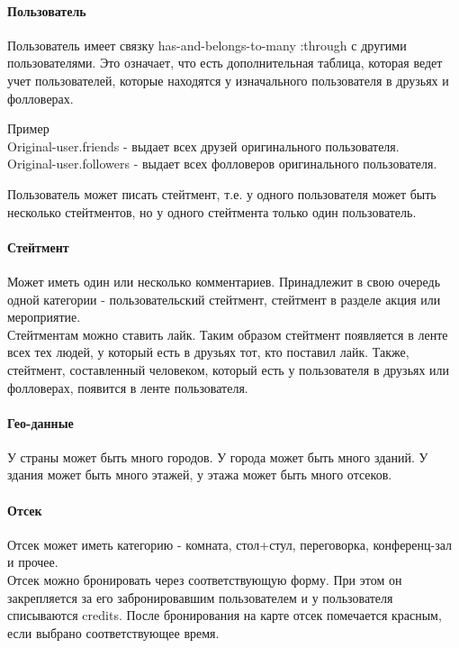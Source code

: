 \documentclass[DIV=calc, paper=a4, fontsize=11pt]{scrartcl} %
\begin{document}
\paragraph{Пользователь}
Пользователь имеет связку has-and-belongs-to-many :through с другими пользователями. Это означает, что есть дополнительная таблица, которая ведет учет пользователей, которые находятся у изначального пользователя в друзьях и фолловерах.

\begin{framed}
Пример
\\[0.5cm]
Original-user.friends - выдает всех друзей оригинального пользователя.
\\[0.5cm]
Original-user.followers - выдает всех фолловеров оригинального пользователя.
\end{framed}

Пользователь может писать стейтмент, т.е. у одного пользователя может быть несколько стейтментов, но у одного стейтмента только один пользователь.

\paragraph{Стейтмент}
Может иметь один или несколько комментариев. Принадлежит в свою очередь одной категории - пользовательский стейтмент, стейтмент в разделе акция или мероприятие. 
\\[0.5cm]
Стейтментам можно ставить лайк. Таким образом стейтмент появляется в ленте всех тех людей, у который есть в друзьях тот, кто поставил лайк. Также, стейтмент, составленный человеком, который есть у пользователя в друзьях или фолловерах, появится в ленте пользователя.

\paragraph{Гео-данные}
У страны может быть много городов. У города может быть много зданий. У здания может быть много этажей, у этажа может быть много отсеков.

\paragraph{Отсек}
Отсек может иметь категорию - комната, стол+стул, переговорка, конференц-зал и прочее.
\\[0.5cm]
Отсек можно бронировать через соответствующую форму. При этом он закрепляется за его забронировавшим пользователем и у пользователя списываются credits. После бронирования на карте отсек помечается красным, если выбрано соответствующее время.
\end{document}
